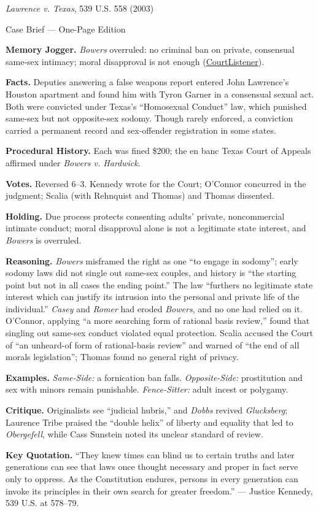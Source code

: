 \documentclass[12pt]{article}
\begin{document}
\begin{center}
{\Large \textit{Lawrence v. Texas}, 539 U.S. 558 (2003)\par}
\vspace{0.3em}
{\normalsize Case Brief --- One-Page Edition\par}
\end{center}

\textbf{Memory Jogger.} \textit{Bowers} overruled: no criminal ban on private, consensual same-sex intimacy; moral disapproval is not enough (\href{https://www.courtlistener.com/opinion/130160/lawrence-v-texas/}{CourtListener}).

\textbf{Facts.} Deputies answering a false weapons report entered John Lawrence's Houston apartment and found him with Tyron Garner in a consensual sexual act. Both were convicted under Texas's ``Homosexual Conduct'' law, which punished same-sex but not opposite-sex sodomy. Though rarely enforced, a conviction carried a permanent record and sex-offender registration in some states.

\textbf{Procedural History.} Each was fined \$200; the en banc Texas Court of Appeals affirmed under \textit{Bowers v. Hardwick}.

\textbf{Votes.} Reversed 6--3. Kennedy wrote for the Court; O'Connor concurred in the judgment; Scalia (with Rehnquist and Thomas) and Thomas dissented.

\textbf{Holding.} Due process protects consenting adults' private, noncommercial intimate conduct; moral disapproval alone is not a legitimate state interest, and \textit{Bowers} is overruled.

\textbf{Reasoning.} \textit{Bowers} misframed the right as one ``to engage in sodomy''; early sodomy laws did not single out same-sex couples, and history is ``the starting point but not in all cases the ending point.'' The law ``furthers no legitimate state interest which can justify its intrusion into the personal and private life of the individual.'' \textit{Casey} and \textit{Romer} had eroded \textit{Bowers}, and no one had relied on it. O'Connor, applying ``a more searching form of rational basis review,'' found that singling out same-sex conduct violated equal protection. Scalia accused the Court of ``an unheard-of form of rational-basis review'' and warned of ``the end of all morals legislation''; Thomas found no general right of privacy.

\textbf{Examples.} \emph{Same-Side:} a fornication ban falls. \emph{Opposite-Side:} prostitution and sex with minors remain punishable. \emph{Fence-Sitter:} adult incest or polygamy.

\textbf{Critique.} Originalists see ``judicial hubris,'' and \textit{Dobbs} revived \textit{Glucksberg}; Laurence Tribe praised the ``double helix'' of liberty and equality that led to \textit{Obergefell}, while Cass Sunstein noted its unclear standard of review.

\textbf{Key Quotation.} ``They knew times can blind us to certain truths and later generations can see that laws once thought necessary and proper in fact serve only to oppress. As the Constitution endures, persons in every generation can invoke its principles in their own search for greater freedom.'' --- Justice Kennedy, 539 U.S. at 578--79.
\end{document}
